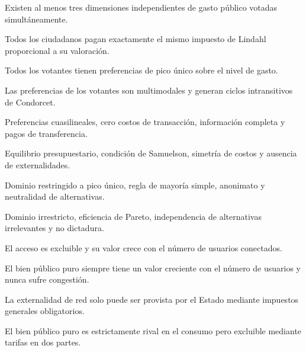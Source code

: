 \begin{opts}
    \item Existen al menos tres dimensiones independientes de gasto público votadas simultáneamente.
    \item Todos los ciudadanos pagan exactamente el mismo impuesto de Lindahl proporcional a su valoración.
    \item Todos los votantes tienen preferencias de pico único sobre el nivel de gasto.
    \item Las preferencias de los votantes son multimodales y generan ciclos intransitivos de Condorcet.
\end{opts}

\begin{opts}
    \item Preferencias cuasilineales, cero costos de transacción, información completa y pagos de transferencia.
    \item Equilibrio presupuestario, condición de Samuelson, simetría de costos y ausencia de externalidades.
    \item Dominio restringido a pico único, regla de mayoría simple, anonimato y neutralidad de alternativas.
    \item Dominio irrestricto, eficiencia de Pareto, independencia de alternativas irrelevantes y no dictadura.
\end{opts}

\begin{opts}
    \item El acceso es excluible y su valor crece con el número de usuarios conectados.
    \item El bien público puro siempre tiene un valor creciente con el número de usuarios y nunca sufre congestión.
    \item La externalidad de red solo puede ser provista por el Estado mediante impuestos generales obligatorios.
    \item El bien público puro es estrictamente rival en el consumo pero excluible mediante tarifas en dos partes.
\end{opts}


